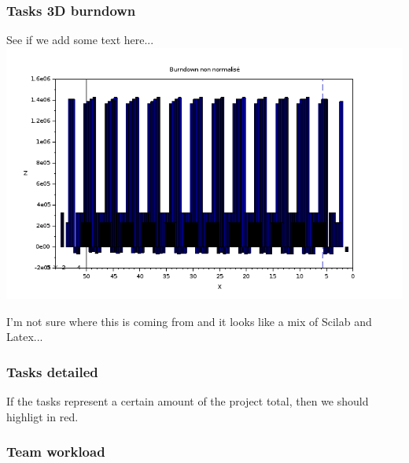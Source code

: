 \documentclass[8pt]{article} %
\begin{document}
\subsubsection{Tasks 3D burndown}


See if we add some text here...\\
%
\includegraphics[scale=0.6]{../Maths/Scilab-burndown.png}

I'm not sure where this is coming from and it looks like a mix of Scilab and Latex...\\

\subsubsection{Tasks detailed}
If the tasks represent a certain amount of the project total, then we should highligt in red.\\






\subsubsection{Team workload}


\end{document}
